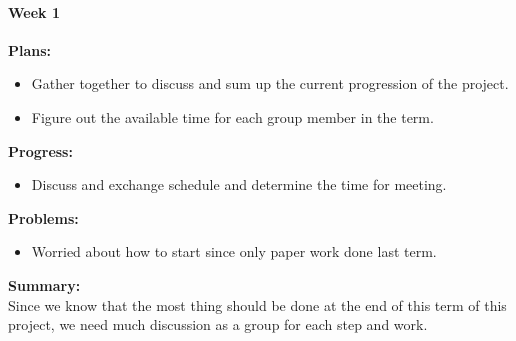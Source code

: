 \paragraph{Week 1}
\begin{adjustwidth}{2.5em}{0pt}
    \vspace{-0.5cm}\textbf{Plans:}
    \vspace{-0.5cm}
    \begin{itemize}
        \item Gather together to discuss and sum up the current progression of the project.
        \item Figure out the available time for each group member in the term. 
    \end{itemize} 
    \vspace{-0.3cm}\textbf{Progress:}
    \vspace{-0.5cm}
    \begin{itemize}
        \item Discuss and exchange schedule and determine the time for meeting. 
    \end{itemize} 
    \vspace{-0.3cm}\textbf{Problems:}
    \vspace{-0.5cm}
    \begin{itemize}
        \item Worried about how to start since only paper work done last term. 
    \end{itemize}  
    \vspace{-0.3cm}\noindent\textbf{Summary:}\\
    \noindent Since we know that the most thing should be done at the end of this term of this project, 
    we need much discussion as a group for each step and work. \\
\end{adjustwidth}

